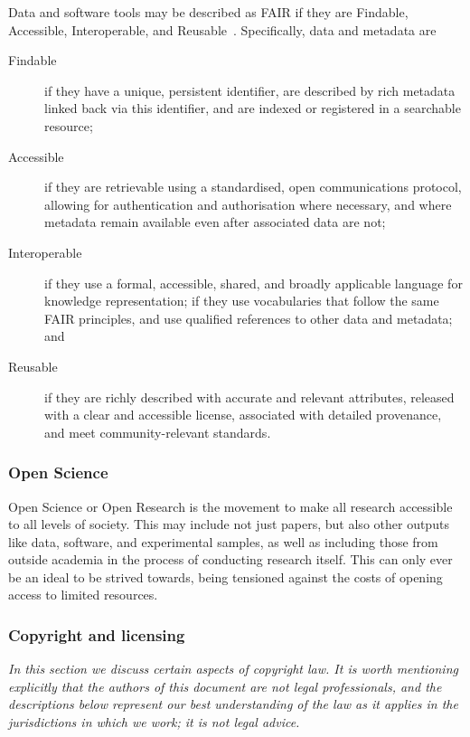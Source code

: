 \documentclass{article}
\begin{document}
Data and software tools may be described as FAIR if they are
Findable, Accessible, Interoperable, and Reusable~\cite{wilkinson2016fair}.
Specifically,
data and metadata are
\begin{description}
  \item[Findable]
        if they have a unique, persistent identifier,
        are described by rich metadata linked back via this identifier,
        and are indexed or registered in a searchable resource;
  \item[Accessible]
        if they are retrievable using a standardised, open communications protocol,
        allowing for authentication and authorisation where necessary,
        and where metadata remain available even after associated data are not;
  \item[Interoperable]
        if they use a formal, accessible, shared, and broadly applicable language for knowledge representation;
        if they use vocabularies that follow the same FAIR principles,
        and use qualified references to other data and metadata;
        and
  \item[Reusable]
        if they are richly described with accurate and relevant attributes,
        released with a clear and accessible license,
        associated with detailed provenance,
        and meet community-relevant standards.
\end{description}

\subsubsection{Open Science}

Open Science or Open Research is
the movement to make all research accessible to all levels of society.
This may include not just papers,
but also other outputs like data, software, and experimental samples,
as well as including those from outside academia in
the process of conducting research itself.
This can only ever be an ideal to be strived towards,
being tensioned against the costs of opening access to limited resources.

\subsubsection{Copyright and licensing}

\emph{
  In this section we discuss certain aspects of copyright law.
  It is worth mentioning explicitly that
  the authors of this document are not legal professionals,
  and the descriptions below represent our best understanding of the law
  as it applies in the jurisdictions in which we work;
  it is not legal advice.
}
\end{document}
